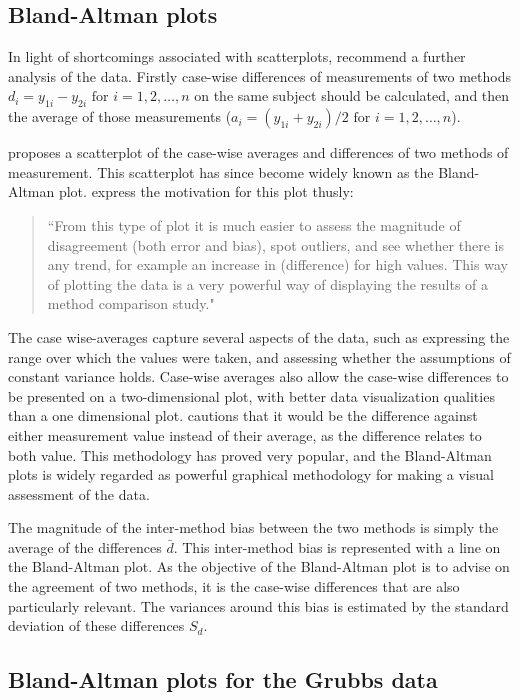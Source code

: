 \documentclass[Chap2main.tex]{subfiles}
\begin{document}
\subsection{Bland-Altman plots}

In light of shortcomings associated with scatterplots,
\citet*{BA83} recommend a further analysis of the data. Firstly
case-wise differences of measurements of two methods $d_{i} =
y_{1i}-y_{2i} \mbox{ for }i=1,2,\dots,n$ on the same subject
should be calculated, and then the average of those measurements
($a_{i} = (y_{1i} + y_{2i})/2 \mbox{ for }i=1,2,\dots, n$).

\citet{BA83} proposes a scatterplot of the case-wise averages and differences of two methods of measurement. This scatterplot has since become widely known as the Bland-Altman plot. \citet*{BA83} express the
motivation for this plot thusly:
\begin{quote}
	``From this type of plot it is much easier to assess the magnitude
	of disagreement (both error and bias), spot outliers, and see
	whether there is any trend, for example an increase in (difference) for high values. This way of plotting the data is a very powerful way of displaying the results of a method comparison study."
\end{quote}

The case wise-averages capture several aspects of the data, such as expressing the range over which the values were taken, and assessing whether the assumptions of constant variance holds.
Case-wise averages also allow the case-wise differences to be presented on a two-dimensional plot, with better data visualization qualities than a one dimensional plot. \citet{BA86}
cautions that it would be the difference against either measurement value instead of their average, as the difference relates to both value. This methodology has proved very popular, and the Bland-Altman plots is widely regarded as powerful graphical methodology for making a visual assessment of the data.

The magnitude of the inter-method bias between the two methods is simply the average of the differences $\bar{d}$. This inter-method bias is represented with a line on the Bland-Altman plot. As the objective of the Bland-Altman plot is to advise on the agreement of two methods, it is the case-wise differences that are also particularly relevant. The variances around this bias is estimated by the standard deviation of these differences $S_{d}$.

\subsection{Bland-Altman plots for the Grubbs data}
\end{document}
